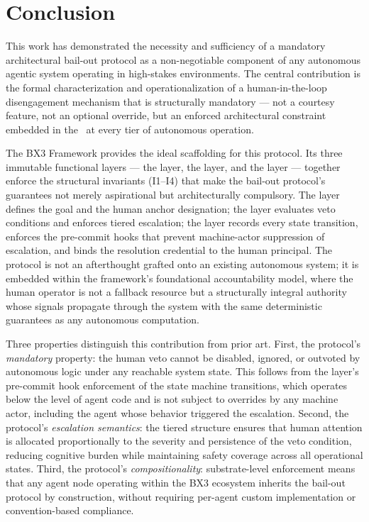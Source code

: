 
\section{Conclusion}

This work has demonstrated the necessity and sufficiency of a mandatory
architectural bail-out protocol as a non-negotiable component of any autonomous
agentic system operating in high-stakes environments.  The central contribution is
the formal characterization and operationalization of a human-in-the-loop
disengagement mechanism that is structurally mandatory --- not a courtesy feature,
not an optional override, but an enforced architectural constraint embedded in the
\substrate\ at every tier of autonomous operation.

The BX3 Framework provides the ideal scaffolding for this protocol.  Its three
immutable functional layers --- the \purpose{} layer, the \bounds{} layer, and the
\fact{} layer --- together enforce the structural invariants (I1--I4) that make
the bail-out protocol's guarantees not merely aspirational but architecturally
compulsory.  The \purpose{} layer defines the goal and the human anchor
designation; the \bounds{} layer evaluates veto conditions and enforces tiered
escalation; the \fact{} layer records every state transition, enforces the
pre-commit hooks that prevent machine-actor suppression of escalation, and binds
the resolution credential to the human principal.  The protocol is not an
afterthought grafted onto an existing autonomous system; it is embedded within the
framework's foundational accountability model, where the human operator is not a
fallback resource but a structurally integral authority whose signals propagate
through the system with the same deterministic guarantees as any autonomous
computation.

Three properties distinguish this contribution from prior art.  First, the
protocol's \emph{mandatory} property: the human veto cannot be disabled, ignored,
or outvoted by autonomous logic under any reachable system state.  This follows
from the \fact{} layer's pre-commit hook enforcement of the state machine
transitions, which operates below the level of agent code and is not subject to
overrides by any machine actor, including the agent whose behavior triggered the
escalation.  Second, the protocol's \emph{escalation semantics}: the tiered
structure ensures that human attention is allocated proportionally to the severity
and persistence of the veto condition, reducing cognitive burden while maintaining
safety coverage across all operational states.  Third, the protocol's
\emph{compositionality}: substrate-level enforcement means that any agent node
operating within the BX3 ecosystem inherits the bail-out protocol by construction,
without requiring per-agent custom implementation or convention-based compliance.

